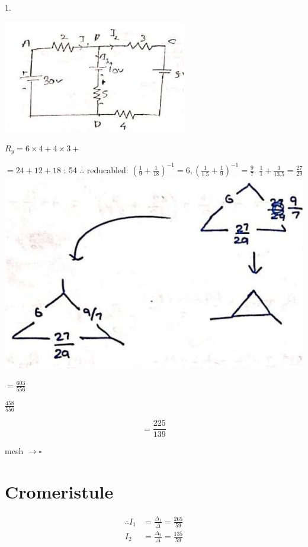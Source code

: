 \documentclass[12pt, a4paper]{article}
\newcommand{\figwidth}{8cm}
\begin{document}
1.

\begin{center}
	\includegraphics[max width=\figwidth]{2024_06_15_f9b8f5fbbfa74e15de4eg-5(1)}
\end{center}

$R_{y}=6 \times 4+4 \times 3+$

$=24+12+18$ : 54 $\therefore$ reducabled: $\left(\frac{1}{9}+\frac{1}{18}\right)^{-1}=6,\left(\frac{1}{1.5}+\frac{1}{9}\right)^{-1}=\frac{9}{7}$. $\frac{1}{1}+\frac{1}{13.5}=\frac{27}{29}$\\
\includegraphics[max width=\textwidth, center]{2024_06_15_f9b8f5fbbfa74e15de4eg-5}

$=\frac{603}{556}$

$\frac{458}{556}$

$$
	=\frac{225}{139}
$$

mesh $\rightarrow \square$

\section*{Cromeristule}
$$
	\begin{aligned}
		\therefore I_{1} & =\frac{\Delta_{1}}{\Delta}=\frac{265}{59} \\
		I_{2}            & =\frac{\Delta_{2}}{\Delta}=\frac{135}{59}
	\end{aligned}
$$
\end{document}
